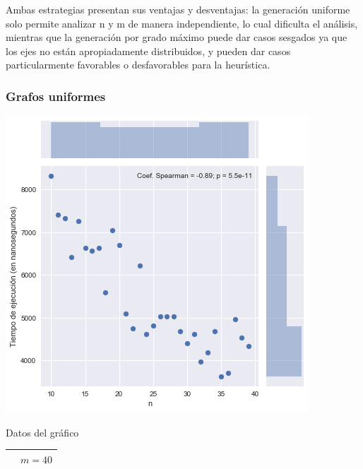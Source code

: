 Ambas estrategias presentan sus ventajas y desventajas: la generación uniforme solo permite analizar n y m de manera independiente, lo cual dificulta el análisis, mientras que la generación por grado máximo puede dar casos sesgados ya que los ejes no están apropiadamente distribuidos, y pueden dar casos particularmente favorables o desfavorables para la heurística.

\subsubsection*{Grafos uniformes}

\noindent
\begin{minipage}{0.49\textwidth}
    \hfill
    \includegraphics[scale=0.55]{img/greedy-n-low.png}

    \begin{center}
        Datos del gráfico

        \begin{tabular}{ | l l |}
            \hline
             & $m = 40$ \\ 
            \hline
        \end{tabular}
    \end{center}
\end{minipage}
\hfill
